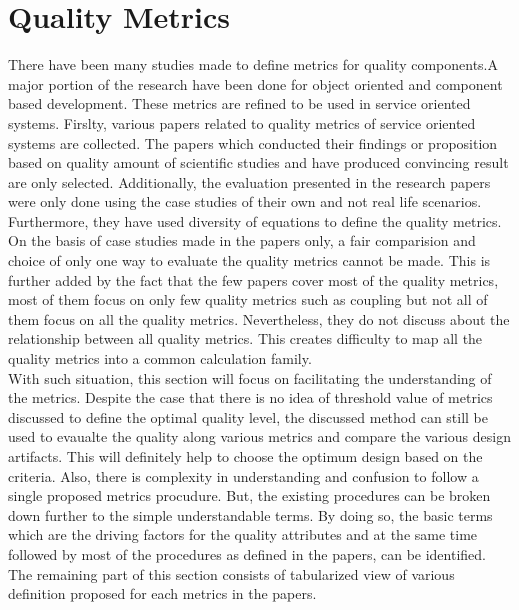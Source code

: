 \section{Quality Metrics}\label{section:quality_of_service/quality_metrics}
There have been many studies made to define metrics for quality components.A major portion of the research have been done for object oriented and component based development. These metrics are refined to be used in service oriented systems.\cite{Xiao-jun:2015aa, Sindhgatta:2015aa} Firslty, various papers related to quality metrics of service oriented systems are collected. The papers which conducted their findings or proposition based on quality amount of scientific studies and have produced convincing result are only selected.  Additionally, the evaluation presented in the research papers were only done using the case studies of their own and not real life scenarios. Furthermore, they have used diversity of equations to define the quality metrics. On the basis of case studies made in the papers only, a fair comparision and choice of only one way to evaluate the quality metrics cannot be made. This is further added by the fact that the few papers cover most of the quality metrics, most of them focus on only few quality metrics such as coupling but not all of them focus on all the quality metrics. Nevertheless, they do not discuss about the relationship between all quality metrics. \cite{Elhag:2014aa} This creates difficulty to map all the quality metrics into a common calculation family. 
\\
With such situation, this section will focus on facilitating the understanding of the metrics. Despite the case that there is no idea of threshold value of metrics discussed to define the optimal quality level, the discussed method can still be used to evaualte the quality along various metrics and compare the various design artifacts. This will definitely help to choose the optimum design based on the criteria. Also, there is complexity in understanding and confusion to follow a single proposed metrics procudure. But, the existing procedures can be broken down further to the simple understandable terms. By doing so, the basic terms which are the driving factors for the quality attributes and at the same time followed by most of the procedures as defined in the papers, can be identified.
The remaining part of this section consists of tabularized view of various definition proposed for each metrics in the papers.
